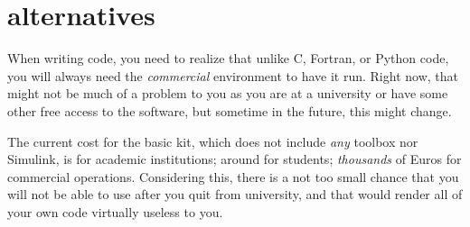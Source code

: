 %
%
%
%
%
\newpage
\section*{\matlab{} alternatives}

When writing \matlab{} code, you need to realize that unlike C, Fortran, or
Python code, you will always need the \emph{commercial} \matlab{} environment
to have it run. Right now, that might not be much of a problem to you as you
are at a university or have some other free access to the software, but
sometime in the future, this might change.

The current cost for the basic \matlab{} kit, which does not include
\emph{any} toolbox nor Simulink, is  for academic institutions;
around  for students; \emph{thousands} of Euros for commercial
operations. Considering this, there is a not too small chance that you will
not be able to use \matlab{} after you quit from university, and that would
render all of your own code virtually useless to you.

